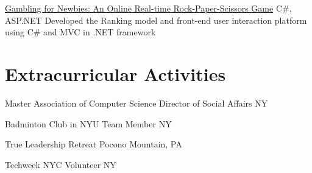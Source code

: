 \documentclass[11pt,a4paper,sans]{moderncv}   %
\begin{document}
{\href{https://github.com/cz764/GamblingForNewbies}{Gambling for Newbies: An Online Real-time Rock-Paper-Scissors Game}}
{C\#, ASP.NET}
{}{}
{{Developed the Ranking model and front-end user interaction platform using C\# and MVC in .NET framework}
}

\section{Extracurricular Activities}
{Master Association of Computer Science}
{Director of Social Affairs}
{NY}{}{}

{Badminton Club in NYU}
{Team Member}
{NY}{}{}

{True Leadership Retreat}
{}
{Pocono Mountain, PA}
{}{}

{Techweek NYC}
{Volunteer}
{NY}
{}{}


\renewcommand{\baselinestretch}{1.0}

\closesection{}                   %
\renewcommand{\listitemsymbol}{-} %
\end{document}
